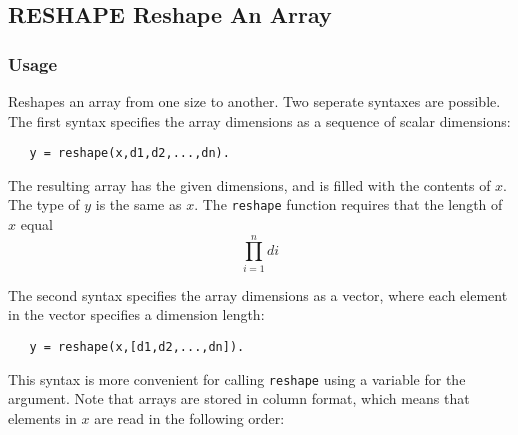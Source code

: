%
%
%
\subsection{RESHAPE Reshape An Array}
\subsubsection{Usage}
Reshapes an array from one size to another. Two seperate 
syntaxes are possible.  The first syntax specifies the array 
dimensions as a sequence of scalar dimensions:
\begin{verbatim}
   y = reshape(x,d1,d2,...,dn).
\end{verbatim}
The resulting array has the given dimensions, and is filled with
the contents of $x$.  The type of $y$ is the same as $x$.  The
\verb|reshape| function requires that the length of $x$ equal
\[
    \prod_{i=1}^{n} di
\]
    
The second syntax specifies the array dimensions as a vector,
where each element in the vector specifies a dimension length:
\begin{verbatim}
   y = reshape(x,[d1,d2,...,dn]).
\end{verbatim}
This syntax is more convenient for calling \verb|reshape| using a 
variable for the argument. Note that arrays are stored in column format, 
which means that elements in $x$ are read in the following order:

